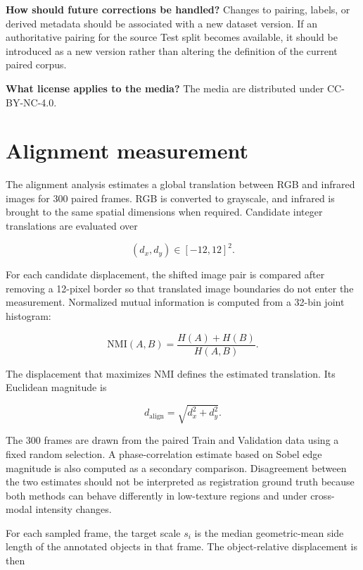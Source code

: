 \documentclass[10pt]{article}
\begin{document}
\textbf{How should future corrections be handled?}
Changes to pairing, labels, or derived metadata should be associated with a new dataset version. If an authoritative pairing for the source Test split becomes available, it should be introduced as a new version rather than altering the definition of the current paired corpus.

\textbf{What license applies to the media?}
The media are distributed under CC-BY-NC-4.0.


\section{Alignment measurement}
\label{app:alignment}

The alignment analysis estimates a global translation between RGB and infrared images for 300 paired frames. RGB is converted to grayscale, and infrared is brought to the same spatial dimensions when required. Candidate integer translations are evaluated over

\begin{equation}
(d_x,d_y)\in[-12,12]^2.
\end{equation}

For each candidate displacement, the shifted image pair is compared after removing a 12-pixel border so that translated image boundaries do not enter the measurement. Normalized mutual information is computed from a 32-bin joint histogram:

\begin{equation}
\mathrm{NMI}(A,B)
=
\frac{H(A)+H(B)}
{H(A,B)}.
\end{equation}

The displacement that maximizes NMI defines the estimated translation. Its Euclidean magnitude is

\begin{equation}
d_{\mathrm{align}}
=
\sqrt{d_x^2+d_y^2}.
\end{equation}

The 300 frames are drawn from the paired Train and Validation data using a fixed random selection. A phase-correlation estimate based on Sobel edge magnitude is also computed as a secondary comparison. Disagreement between the two estimates should not be interpreted as registration ground truth because both methods can behave differently in low-texture regions and under cross-modal intensity changes.

For each sampled frame, the target scale $s_i$ is the median geometric-mean side length of the annotated objects in that frame. The object-relative displacement is then
\end{document}
